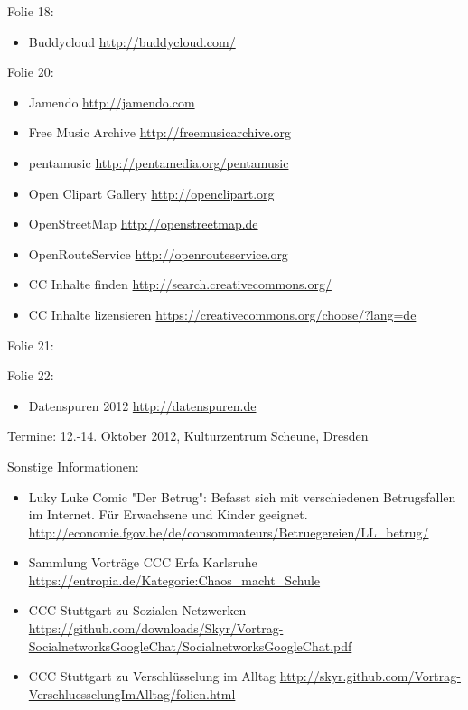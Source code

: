 \documentclass[a4paper]{scrartcl}
\begin{document}
Folie 18:
\begin{itemize}
\item Buddycloud \url{http://buddycloud.com/}
\end{itemize}


Folie 20:
\begin{itemize}
\item Jamendo \url{http://jamendo.com}
\item Free Music Archive \url{http://freemusicarchive.org}
\item pentamusic \url {http://pentamedia.org/pentamusic}
\item Open Clipart Gallery \url{http://openclipart.org}
\item OpenStreetMap \url{http://openstreetmap.de}
\item OpenRouteService \url{http://openrouteservice.org}
\item CC Inhalte finden \url{http://search.creativecommons.org/}
\item CC Inhalte lizensieren \url{https://creativecommons.org/choose/?lang=de}
\end{itemize}


Folie 21:


Folie 22:
\begin{itemize}
\item Datenspuren 2012 \url{http://datenspuren.de}
\end{itemize}
Termine: 12.-14. Oktober 2012, Kulturzentrum Scheune, Dresden


Sonstige Informationen:
\begin{itemize}
\item Luky Luke Comic "Der Betrug": Befasst sich mit verschiedenen Betrugsfallen im Internet. Für Erwachsene und Kinder geeignet. \url{http://economie.fgov.be/de/consommateurs/Betruegereien/LL_betrug/}
\item Sammlung Vorträge CCC Erfa Karlsruhe \url{https://entropia.de/Kategorie:Chaos_macht_Schule}
\item CCC Stuttgart zu Sozialen Netzwerken \url{https://github.com/downloads/Skyr/Vortrag-SocialnetworksGoogleChat/SocialnetworksGoogleChat.pdf}
\item CCC Stuttgart zu Verschlüsselung im Alltag \url{http://skyr.github.com/Vortrag-VerschluesselungImAlltag/folien.html}
\end{itemize}
\end{document}
